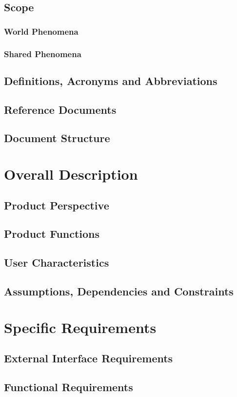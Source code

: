 \documentclass[a4paper, oneside]{book}
\begin{document}
\section{Scope}
\subsection{World Phenomena}
\subsection{Shared Phenomena}
\section{Definitions, Acronyms and Abbreviations}
\section{Reference Documents}
\section{Document Structure}

\chapter{Overall Description}
\section{Product Perspective}
\section{Product Functions}
\section{User Characteristics}
\section{Assumptions, Dependencies and Constraints}

\chapter{Specific Requirements}
\section{External Interface Requirements}
\section{Functional Requirements}
\end{document}
